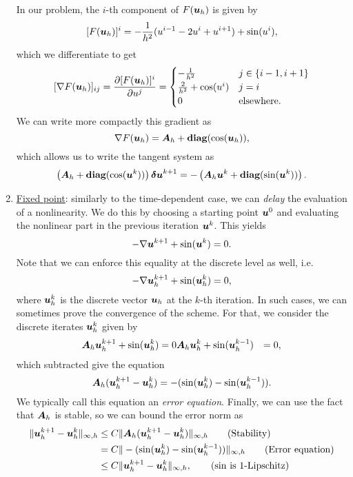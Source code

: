 \documentclass{article}
\renewcommand{\vec}{\vectorsym}
\newcommand{\mat}{\matrixsym}
\begin{document}
\begin{enumerate}
    In our problem, the $i$-th component of $F(\vec u_h)$ is given by
    $$
    [F(\vec u_h)]^i = -\frac{1}{h^2}(u^{i-1}-2u^i+u^{i+1}) + \sin(u^i),
    $$
    which we differentiate to get
    $$
    [\nabla F(\vec u_h)]_{ij} = \frac{\partial [F(\vec u_h)]^i}{\partial u^j} = \begin{cases}
        -\frac{1}{h^2} &j\in\{i-1,i+1\}\\
        \frac{2}{h^2} + \cos(u^i) &j=i\\
        0 &\text{elsewhere.}
    \end{cases}
    $$
    We can write more compactly this gradient as
    $$
    \nabla F(\vec u_h) = \mat A_h + \textbf{diag}(\cos(\vec u_h)),
    $$
    which allows us to write the tangent system as
    $$
    \left(\mat A_h + \textbf{diag}(\cos(\vec u^k))\right)\vec{\delta u}^{k+1} = -\left(\mat A_h \vec{u}^k + \textbf{diag}(\sin(\vec u^k))\right).
    $$
    \item \underline{Fixed point}: similarly to the time-dependent case, we can \textit{delay} the evaluation of a nonlinearity. We do this by choosing a starting point $\vec u^0$ and evaluating the nonlinear part in the previous iteration $\vec u^k$. This yields
    $$
    -\nabla \vec u^{k+1} + \sin(\vec u^k) = 0.
    $$
    Note that we can enforce this equality at the discrete level as well, i.e. 
    $$
    -\nabla \vec u_h^{k+1} + \sin(\vec u_h^k) = 0,
    $$
    where $\vec u_h^k$ is the discrete vector $\vec u_h$ at the $k$-th iteration. In such cases, we can sometimes prove the convergence of the scheme. For that, we consider the discrete iterates $\vec u_h^k$ given by
    \begin{align*}
        \mat A_h \vec u_h^{k+1} + \sin(\vec u_h^k) &= 0
        \mat A_h \vec u_h^{k} + \sin(\vec u_h^{k-1}) &= 0,
    \end{align*}
    which subtracted give the equation
    $$
    \mat A_h(\vec u_h^{k+1} - \vec u_h^{k}) = -(\sin(\vec u_h^k) - \sin(\vec u_h^{k-1})).
    $$
    We typically call this equation an \textit{error equation}. Finally, we can use the fact that $\mat A_h$ is stable, so we can bound the error norm as
    \begin{align*}
        \|\vec u_h^{k+1} - \vec u_h^{k}\|_{\infty, h} &\leq C\|\mat A_h (\vec u_h^{k+1} - \vec u_h^{k})\|_{\infty, h} \tag{Stability}\\
        &= C\|-(\sin(\vec u_h^k) - \sin(\vec u_h^{k-1}))\|_{\infty, h}\tag{Error equation}\\
        &\leq C\|\vec u_h^{k+1} - \vec u_h^{k}\|_{\infty, h},\tag{$\sin$ is $1$-Lipschitz}

\end{align*}
\end{enumerate}
\end{document}
